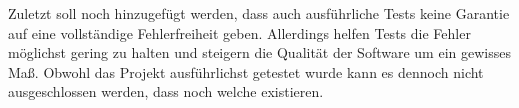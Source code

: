 Zuletzt soll noch hinzugefügt werden, dass auch ausführliche Tests keine Garantie auf eine vollständige Fehlerfreiheit geben.
Allerdings helfen Tests die Fehler möglichst gering zu halten und steigern die Qualität der Software um ein gewisses Maß.
Obwohl das Projekt ausführlichst getestet wurde kann es dennoch nicht ausgeschlossen werden, dass noch welche existieren. 
